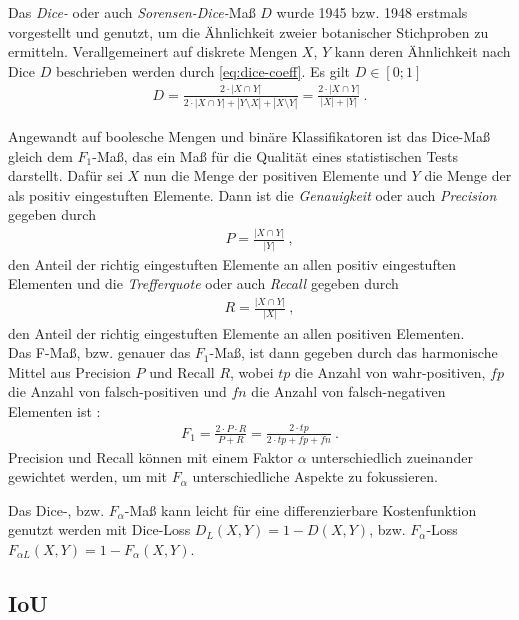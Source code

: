 Das \textit{Dice-} oder auch \textit{Sorensen-Dice-}Maß $D$ wurde 1945 bzw. 1948 erstmals vorgestellt und genutzt, um die Ähnlichkeit zweier botanischer Stichproben zu ermitteln. Verallgemeinert auf diskrete Mengen $X$, $Y$ kann deren Ähnlichkeit nach Dice $D$ beschrieben werden durch \autoref{eq:dice-coeff}. Es gilt $D \in [0; 1]$ \cite{Dice.1945} 
\begin{align}
	\label{eq:dice-coeff} D = \frac{2 \cdot | X \cap Y |}{2 \cdot | X \cap Y | + |Y \setminus X| + |X \setminus Y|} 
	=\frac{2 \cdot | X \cap Y |}{|X| + |Y|} ~.
\end{align} 

Angewandt auf boolesche Mengen und binäre Klassifikatoren ist das Dice-Maß gleich dem $F_1$-Maß, das ein Maß für die Qualität eines statistischen Tests darstellt. Dafür sei $X$ nun die Menge der positiven Elemente und $Y$ die Menge der als positiv eingestuften Elemente. Dann ist die \textit{Genauigkeit} oder auch \textit{Precision} gegeben durch
\begin{align}
	\label{eq:precision} P = \frac{|X \cap Y|}{|Y|}~,
\end{align}
den Anteil der richtig eingestuften Elemente an allen positiv eingestuften Elementen und die \textit{Trefferquote} oder auch \textit{Recall} gegeben durch
\begin{align}
	\label{eq:recall} R = \frac{|X \cap Y|}{|X|}~,
\end{align}
den Anteil der richtig eingestuften Elemente an allen positiven Elementen. \\
Das F-Maß, bzw. genauer das $F_1$-Maß, ist dann gegeben durch das harmonische Mittel aus Precision $P$ und Recall $R$, wobei $tp$ die Anzahl von wahr-positiven, $fp$ die Anzahl von falsch-positiven und $fn$ die Anzahl von falsch-negativen Elementen ist \cite{YutakaSasaki.2007}:
\begin{align}
	\label{eq:f1} F_{1} = \frac{2\cdot P\cdot R}{P + R} = \frac{2\cdot tp}{2 \cdot tp + fp + fn}~.
\end{align}
Precision und Recall können mit einem Faktor $\alpha$ unterschiedlich zueinander gewichtet werden, um mit $F_{\alpha}$ unterschiedliche Aspekte zu fokussieren. 

Das Dice-, bzw. $F_{\alpha}$-Maß kann leicht für eine differenzierbare Kostenfunktion genutzt werden mit Dice-Loss $D_{L}(X, Y) = 1 - D(X,Y)$, bzw. $F_{\alpha}$-Loss $F_{\alpha L}(X,Y) = 1 - F_{\alpha}(X,Y)$. 


\subsection{\acf{IoU}}

